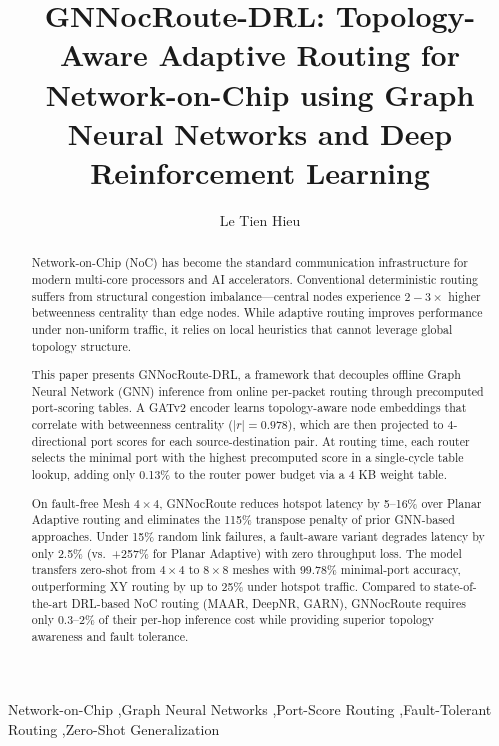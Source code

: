 \documentclass[5p,twocolumn]{elsarticle}
\begin{document}
\begin{frontmatter}

\title{GNNocRoute-DRL: Topology-Aware Adaptive Routing for Network-on-Chip using Graph Neural Networks and Deep Reinforcement Learning}

\author[1]{Le Tien Hieu}

\address[1]{Institute of Information Technology, Vietnam National University, Hanoi, Vietnam}

\begin{abstract}
Network-on-Chip (NoC) has become the standard communication infrastructure for modern multi-core processors and AI accelerators. Conventional deterministic routing suffers from structural congestion imbalance---central nodes experience $2-3\times$ higher betweenness centrality than edge nodes. While adaptive routing improves performance under non-uniform traffic, it relies on local heuristics that cannot leverage global topology structure.

This paper presents GNNocRoute-DRL, a framework that decouples offline Graph Neural Network (GNN) inference from online per-packet routing through precomputed port-scoring tables. A GATv2 encoder learns topology-aware node embeddings that correlate with betweenness centrality ($|r| = 0.978$), which are then projected to $4$-directional port scores for each source-destination pair. At routing time, each router selects the minimal port with the highest precomputed score in a single-cycle table lookup, adding only 0.13\% to the router power budget via a 4 KB weight table.

On fault-free Mesh $4\times4$, GNNocRoute reduces hotspot latency by 5--16\% over Planar Adaptive routing and eliminates the 115\% transpose penalty of prior GNN-based approaches. Under 15\% random link failures, a fault-aware variant degrades latency by only 2.5\% (vs.~+257\% for Planar Adaptive) with zero throughput loss. The model transfers zero-shot from $4\times4$ to $8\times8$ meshes with 99.78\% minimal-port accuracy, outperforming XY routing by up to 25\% under hotspot traffic. Compared to state-of-the-art DRL-based NoC routing (MAAR, DeepNR, GARN), GNNocRoute requires only 0.3--2\% of their per-hop inference cost while providing superior topology awareness and fault tolerance.
\end{abstract}

\begin{keyword}
Network-on-Chip \sep Graph Neural Networks \sep Port-Score Routing \sep Fault-Tolerant Routing \sep Zero-Shot Generalization
\end{keyword}

\end{frontmatter}










\nocite{*}


\end{document}
